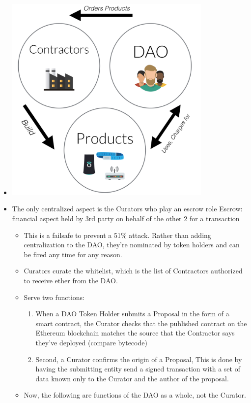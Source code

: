 \documentclass{article}
\begin{document}
\begin{itemize}
  \item \includegraphics[width=4in]{synergistic.png}\\
  \item The only centralized aspect is the Curators who play an escrow role
    \subitem Escrow: financial aspect held by 3rd party on behalf of the other 2 for a transaction
    \begin{itemize}
      \item This is a failsafe to prevent a 51\% attack. Rather than adding centralization to the DAO, they're nominated by token holders and can be
        fired any time for any reason. 
      \item Curators curate the whitelist, which is the list of Contractors authorized to receive ether from the DAO.
      \item Serve two functions:
        \begin{enumerate}
          \item When a DAO Token Holder submits a Proposal in the form of a smart contract, the Curator checks that the published contract on the Ethereum blockchain
            matches the source that the Contractor says they've deployed (compare bytecode)
          \item Second, a Curator confirms the origin of a Proposal, This is done by having the submitting entity send a signed transaction with a set of data known only to the
            Curator and the author of the proposal.
        \end{enumerate}
      \item Now, the following are functions of the DAO as a whole, not the Curator.

\end{itemize}
\end{itemize}
\end{document}
